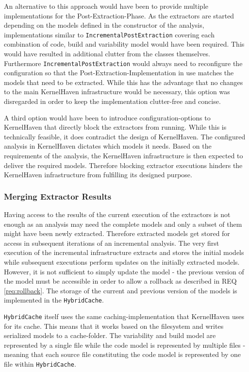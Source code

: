 \documentclass[a4paper]{article}
\begin{document}
An alternative to this approach would have been to provide multiple implementations for the Post-Extraction-Phase. As the extractors are started depending on the models defined in the constructor of the analysis, implementations similar to \texttt{Incremental\-Post\-Extraction} covering each combination of code, build and variability model would have been required. This would have resulted in additional clutter from the classes themselves. Furthermore \texttt{Incremental\-Post\-Extraction} would always need to reconfigure the configuration so that the Post-Extraction-Implementation in use matches the models that need to be extracted. While this has the advantage that no changes to the main KernelHaven infrastructure would be necessary, this option was disregarded in order to keep the implementation clutter-free and concise.

A third option would have been to introduce configuration-options to KernelHaven that directly block the extractors from running. While this is technically feasible, it does contradict the design of KernelHaven. The configured analysis in KernelHaven dictates which models it needs. Based on the requirements of the analysis, the KernelHaven infrastructure is then expected to deliver the required models.  Therefore blocking extractor executions hinders the KernelHaven infrastructure from fulfilling its designed purpose. 

\subsubsection{Merging Extractor Results}

Having access to the results of the current execution of the extractors is not enough as an analysis may need the complete models and only a subset of them might have been newly extracted. Therefore extracted models get stored for access in subsequent iterations of an incremental analysis. The very first execution of the incremental infrastructure extracts and stores the initial models while subsequent executions perform updates on the initially extracted models. However, it is not sufficient to simply update the model - the previous version of the model must be accessible in order to allow a rollback as described in REQ \ref{req:rollback}. The storage of the current and previous version of the models is implemented in the \texttt{Hybrid\-Cache}.

\texttt{Hybrid\-Cache} itself uses the same caching-implementation that KernelHaven uses for its cache. This means that it works based on the filesystem and writes serialized models to a cache-folder. The variability and build model are represented by a single file while the code model is represented by multiple files - meaning that each source file constituting the code model is represented by one file within \texttt{Hybrid\-Cache}.
 
\end{document}
